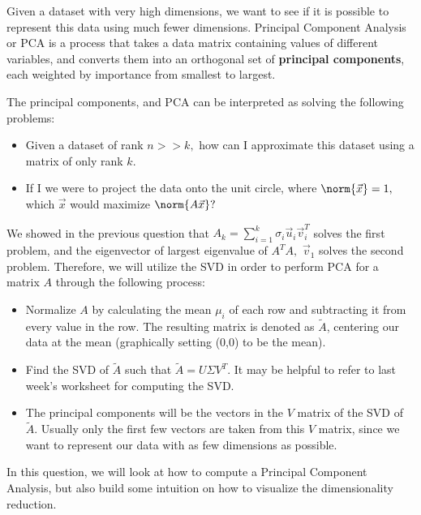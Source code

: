 

Given a dataset with very high dimensions, we want to see if it is possible to represent this data using much fewer dimensions. 
Principal Component Analysis or PCA is a process that takes a data matrix containing values of different variables, and converts them into an orthogonal set of \textbf{principal components}, each weighted by importance from smallest to largest.

The principal components, and PCA can be interpreted as solving the following problems:
\begin{itemize}
  \item Given a dataset of rank $n >> k,$ how can I approximate this dataset using a matrix of only rank $k.$
  \item If I we were to project the data onto the unit circle, where $\norm{\vec{x}} = 1,$ which $\vec{x}$ would maximize $\norm{A \vec{x}}?$
\end{itemize}

We showed in the previous question that $A_{k} = \sum\limits_{i = 1}^{k} \sigma_{i} \vec{u}_{i} \vec{v}_{i}^{T}$ solves the first problem, and the eigenvector of largest eigenvalue of $A^{T}A,$ $\vec{v}_{1}$ solves the second problem. Therefore, we will utilize the SVD in order to perform PCA for a matrix $A$ through the following process:
\begin{itemize}
  \item Normalize $A$ by calculating the mean $\mu_{i}$ of each row and subtracting it from every value in the row. The resulting matrix is denoted as $\tilde{A}$, centering our data at the mean (graphically setting (0,0) to be the mean).
  \item Find the SVD of $\tilde{A}$ such that $\tilde{A} = U \Sigma V^T$. It may be helpful to refer to last week's worksheet for computing the SVD.
  \item The principal components will be the vectors in the $V$ matrix of the SVD of $\tilde{A}.$ 
  Usually only the first few vectors are taken from this $V$ matrix, since we want to represent our data with as few dimensions as possible.
\end{itemize}

In this question, we will look at how to compute a Principal Component Analysis, but also build some intuition on how to visualize the dimensionality reduction.

